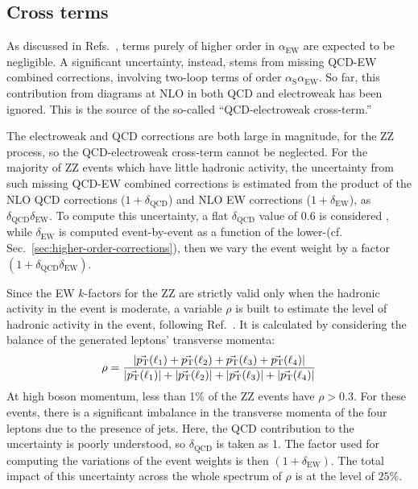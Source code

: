 \subsection{Cross terms}

As discussed in Refs.~\cite{Bierweiler:2013dja,Gieseke:2014gka}, terms purely of higher
order in $\alpha_{\mathrm{EW}}$ are expected to be negligible.
A significant uncertainty, instead, stems from missing
QCD-EW combined corrections, \eg involving two-loop terms of order
$\alpha_{\mathrm{S}}\alpha_{\mathrm{EW}}$.
So far, this contribution from diagrams at NLO in both QCD and electroweak has been ignored.
This is the source of the so-called ``QCD-electroweak cross-term.''

The electroweak and QCD corrections are both large in magnitude, for the ZZ process, 
so the QCD-electroweak cross-term cannot be neglected.
For the majority of ZZ events which have little hadronic activity, the
uncertainty from such missing QCD-EW combined corrections is
estimated from the product of the NLO QCD corrections 
($1+\delta_{\mathrm{QCD}}$) and NLO EW corrections
($1+\delta_{\mathrm{EW}}$), as
$\delta_{\mathrm{QCD}}\delta_{\mathrm{EW}}$. To compute this 
uncertainty, a flat $\delta_{\mathrm{QCD}}$ value of
$0.6$ is considered , while $\delta_{\mathrm{EW}}$ is computed event-by-event as a
function of the lower-\Z \pt (cf. Sec.~\ref{sec:higher-order-corrections}), then we
vary the event weight by a factor
$(1+\delta_{\mathrm{QCD}}\delta_{\mathrm{EW}})$.

Since the EW $k$-factors for the ZZ are strictly valid only when the hadronic
activity in the event is moderate, a variable $\rho$ is built to estimate the level of
hadronic activity in the event, following Ref.~\cite{Gieseke:2014gka}.
It is calculated by considering the balance of the generated leptons' transverse momenta: 
\begin{equation}
\label{eq:the_rho}
\rho = \frac{\left|\vec{p_{\mathrm{T}}}(\ell_1)+\vec{p_{\mathrm{T}}}(\ell_2)+\vec{p_{\mathrm{T}}}(\ell_3)+\vec{p_{\mathrm{T}}}(\ell_4)\right|}{\left|\vec{p_{\mathrm{T}}}(\ell_1)\right|+\left|\vec{p_{\mathrm{T}}}(\ell_2)\right|+\left|\vec{p_{\mathrm{T}}}(\ell_3)\right|+\left|\vec{p_{\mathrm{T}}}(\ell_4)\right|}
\end{equation} 
At high boson momentum, less than 1\% of the ZZ events have $\rho>0.3$.
For these events, there is a significant imbalance in the
transverse momenta of the four leptons due to the presence of jets.
Here, the QCD contribution to the uncertainty is poorly understood, so $\delta_{\mathrm{QCD}}$ is taken as 1.
The factor used for computing the variations of the event weights is then $(1+\delta_{\mathrm{EW}})$.
The total impact of this uncertainty across the whole spectrum of $\rho$ is at the level of $25\%$.

